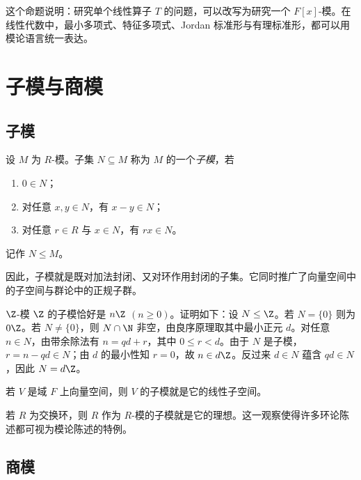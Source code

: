 \begin{remark}
这个命题说明：研究单个线性算子 $T$ 的问题，可以改写为研究一个 $F[x]$-模。在线性代数中，最小多项式、特征多项式、Jordan 标准形与有理标准形，都可以用模论语言统一表达。
\end{remark}

\section{子模与商模}

\subsection{子模}

\begin{definition}
设 $M$ 为 $R$-模。子集 $N\subseteq M$ 称为 $M$ 的一个\emph{子模}，若
\begin{enumerate}[label=(\arabic*)]
  \item $0\in N$；
  \item 对任意 $x,y\in N$，有 $x-y\in N$；
  \item 对任意 $r\in R$ 与 $x\in N$，有 $rx\in N$。
\end{enumerate}
记作 $N\le M$。
\end{definition}

因此，子模就是既对加法封闭、又对环作用封闭的子集。它同时推广了向量空间中的子空间与群论中的正规子群。

\begin{example}
$\Z$-模 $\Z$ 的子模恰好是 $n\Z$ $(n\ge 0)$。证明如下：设 $N\le \Z$。若 $N=\{0\}$ 则为 $0\Z$。若 $N\ne\{0\}$，则 $N\cap \N$ 非空，由良序原理取其中最小正元 $d$。对任意 $n\in N$，由带余除法有 $n=qd+r$，其中 $0\le r<d$。由于 $N$ 是子模，$r=n-qd\in N$；由 $d$ 的最小性知 $r=0$，故 $n\in d\Z$。反过来 $d\in N$ 蕴含 $qd\in N$，因此 $N=d\Z$。
\end{example}

\begin{example}
若 $V$ 是域 $F$ 上向量空间，则 $V$ 的子模就是它的线性子空间。
\end{example}

\begin{example}
若 $R$ 为交换环，则 $R$ 作为 $R$-模的子模就是它的理想。这一观察使得许多环论陈述都可视为模论陈述的特例。
\end{example}

\subsection{商模}

